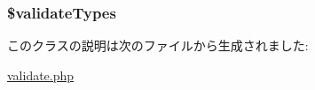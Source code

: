 \label{class_validate_a811d22ac55b4592f7f2a202529629419}
\hypertarget{class_validate_a0a107d78bd1edf9ebad9ebd04a8e1b21}{
\subsubsection[{\$validate\-Types}]{\setlength{\rightskip}{0pt plus 5cm}\$validate\-Types}}
\label{class_validate_a0a107d78bd1edf9ebad9ebd04a8e1b21}


このクラスの説明は次のファイルから生成されました\-:\begin{DoxyCompactItemize}
\item 
\hyperlink{validate_8php}{validate.\-php}\end{DoxyCompactItemize}
